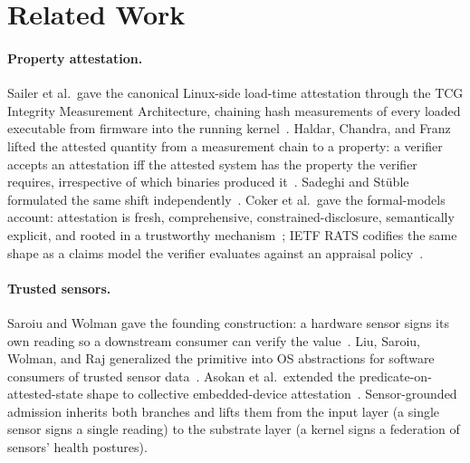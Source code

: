 \section{Related Work}
\label{sec:related}

\paragraph{Property attestation.}
Sailer et al.\ gave the canonical Linux-side load-time attestation through the TCG Integrity Measurement Architecture, chaining hash measurements of every loaded executable from firmware into the running kernel~\cite{sailerIMA2004}. Haldar, Chandra, and Franz lifted the attested quantity from a measurement chain to a property: a verifier accepts an attestation iff the attested system has the property the verifier requires, irrespective of which binaries produced it~\cite{haldarSemanticAttestation2004}. Sadeghi and St{\"u}ble formulated the same shift independently~\cite{sadeghiPropertyAttestation2004}. Coker et al.\ gave the formal-models account: attestation is fresh, comprehensive, constrained-disclosure, semantically explicit, and rooted in a trustworthy mechanism~\cite{cokerRemoteAttestation2011}; IETF RATS codifies the same shape as a claims model the verifier evaluates against an appraisal policy~\cite{rfc9334RATS}.

\paragraph{Trusted sensors.}
Saroiu and Wolman gave the founding construction: a hardware sensor signs its own reading so a downstream consumer can verify the value~\cite{saroiuTrustedSensors2010}. Liu, Saroiu, Wolman, and Raj generalized the primitive into OS abstractions for software consumers of trusted sensor data~\cite{liuTrustedSensors2012}. Asokan et al.\ extended the predicate-on-attested-state shape to collective embedded-device attestation~\cite{asokanSEDA2015}. Sensor-grounded admission inherits both branches and lifts them from the input layer (a single sensor signs a single reading) to the substrate layer (a kernel signs a federation of sensors' health postures).

